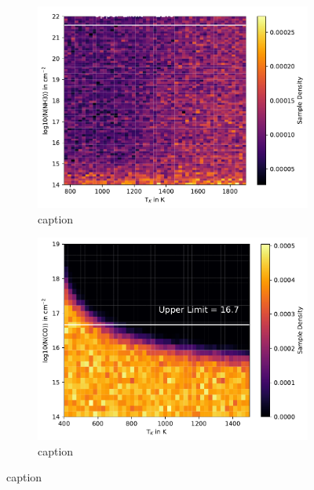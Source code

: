 \documentclass[oneside, single, authoryear, semicolon, 12pt]{lion-msc}
\newcommand{\4}{$_4$}
\newcommand{\3}{$_3$}
\newcommand{\2}{$_2$}
\begin{document}
\begin{figure}[!ht]
    \centering
    \begin{subfigure}[b]{0.49\textwidth}
        \centering
        \includegraphics[width=\textwidth]{radexpy_niels/Radexpy_for_Niels/upper_NH3_V1094Sco.pdf}
        \caption{caption}
    \end{subfigure}
    \hfill
    \begin{subfigure}[b]{0.49\textwidth}
        \centering
        \includegraphics[width=\textwidth]{upper_CO_V1094Sco.pdf}
        \caption{caption}
    \end{subfigure}
    \caption{caption}
\end{figure}
\end{document}
